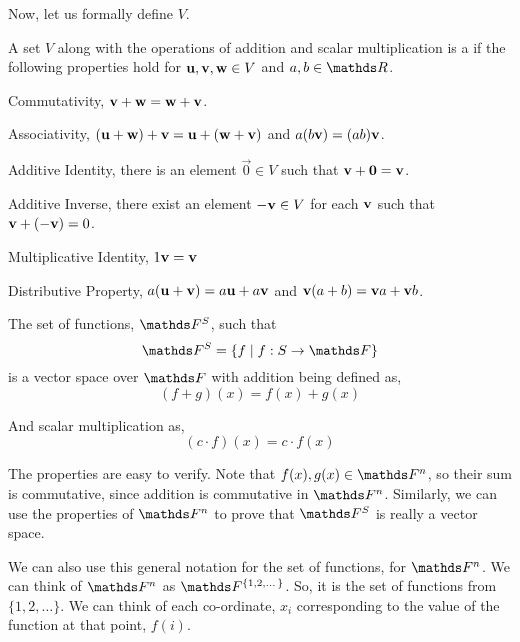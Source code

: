 Now, let us formally define \(V\). 

\begin{definition}
    A set \(V\) along with the operations of addition and scalar multiplication is a  if the following properties hold for \(\boldsymbol{\mathbf{u}}, \boldsymbol{\mathbf{v}}, \boldsymbol{\mathbf{w}} \in V\) and \(a, b \in \RR\).

    \begin{axioms}
        \item Commutativity, \(\boldsymbol{\mathbf{v}} + \boldsymbol{\mathbf{w}} = \boldsymbol{\mathbf{w}} + \boldsymbol{\mathbf{v}}\).
        \item Associativity, \((\boldsymbol{\mathbf{u}} + \boldsymbol{\mathbf{w}}) + \boldsymbol{\mathbf{v}} = \boldsymbol{\mathbf{u}} + (\boldsymbol{\mathbf{w}} + \boldsymbol{\mathbf{v}})\) and \(a(b\boldsymbol{\mathbf{v}}) = (ab)\boldsymbol{\mathbf{v}}\).
        \item Additive Identity, there is an element \(\vec{0} \in V\) such that \(\boldsymbol{\mathbf{v}} + \boldsymbol{\mathbf{0}} = \boldsymbol{\mathbf{v}}\).
        \item Additive Inverse, there exist an element \(-\boldsymbol{\mathbf{v}} \in V\) for each \(\boldsymbol{\mathbf{v}}\) such that 
        \(\boldsymbol{\mathbf{v}} + (-\boldsymbol{\mathbf{v}}) = 0\).
        \item Multiplicative Identity, \(1\boldsymbol{\mathbf{v}} = \boldsymbol{\mathbf{v}}\)
        \item Distributive Property, \(a(\boldsymbol{\mathbf{u}} + \boldsymbol{\mathbf{v}}) = a\boldsymbol{\mathbf{u}} + a\boldsymbol{\mathbf{v}}\) and \(\boldsymbol{\mathbf{v}}(a + b) = \boldsymbol{\mathbf{v}} a + \boldsymbol{\mathbf{v}} b\). 
    \end{axioms}

\end{definition}

\begin{example}
    The set of functions, \(\FF^S\), such that \[ \FF^S = \{ f \given f : S \to \FF\}\]
    is a vector space over \(\FF\) with addition being defined as, 
    \begin{equation*}
    (f + g)(x) = f(x) + g(x)
    \end{equation*}

    And scalar multiplication as, 
    \begin{equation*}
        (c \cdot f)(x) = c \cdot f(x)
    \end{equation*}

    The properties are easy to verify. Note that \(f(x), g(x) \in \FF^n\), so their sum is commutative, since 
    addition is commutative in \(\FF^n\). Similarly, we can use the properties of \(\FF^n\) to 
    prove that \(\FF^S\) is really a vector space.
\end{example}

We can also use this general notation for the set of functions, for \(\FF^n\). 
We can think of \(\FF^n\) as \(\FF^{\{1, 2, \dots\}}\). So, it is the set of functions 
from \(\{1, 2, \dots\}\). We can think of each co-ordinate, \(x_i\) corresponding to 
the value of the function at that point, \(f(i)\).

